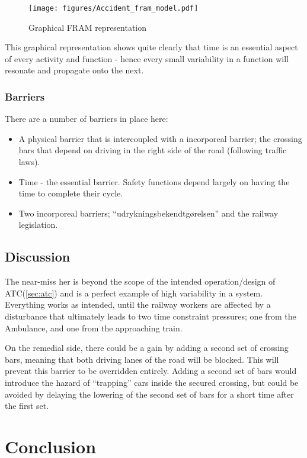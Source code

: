 \begin{figure}[h]
 \centering
   \texttt{[image: figures/Accident\_fram\_model.pdf]}
 \caption{Graphical FRAM representation}
 \label{fig:fram_graphical}
\end{figure}

This graphical representation shows quite clearly that time is an essential aspect of every activity and function - hence every small variability in a function will resonate and propagate onto the next.

\subsection{Barriers}
There are a number of barriers in place here:
\begin{itemize}
  \item A physical barrier that is intercoupled with a incorporeal barrier; the crossing bars that depend on driving in the right side of the road (following traffic laws).
  \item Time - the essential barrier. Safety functions depend largely on having the time to complete their cycle.
  \item Two incorporeal barriers; ``udrykningsbekendtgørelsen'' and the railway legislation.

\end{itemize}

\section{Discussion}

The near-miss her is beyond the scope of the intended operation/design of ATC(\ref{sec:atc}) and is a perfect example of high variability in a system. Everything works as intended, until the railway workers are affected by a disturbance that ultimately leads to two time constraint pressures; one from the Ambulance, and one from the approaching train.

On the remedial side, there could be a gain by adding a second set of crossing bars, meaning that both driving lanes of the road will be blocked. This will prevent this barrier to be overridden entirely. Adding a second set of bars would introduce the hazard of ``trapping'' cars inside the secured crossing, but could be avoided by delaying the lowering of the second set of bars for a short time after the first set.


\chapter{Conclusion}

